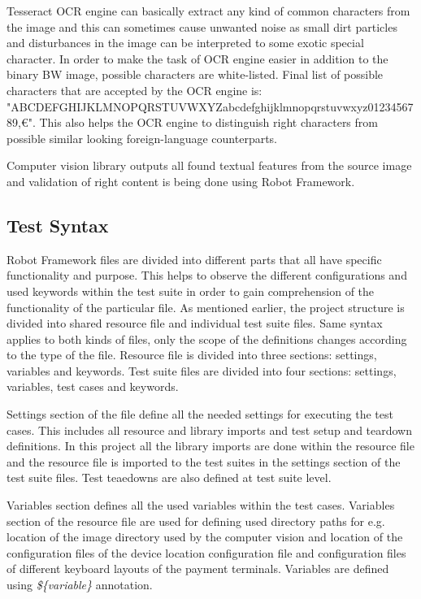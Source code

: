 Tesseract OCR engine can basically extract any kind of common characters from the image and this can sometimes cause unwanted noise as small dirt particles and disturbances in the image can be interpreted to some exotic special character. In order to make the task of OCR engine easier in addition to the binary BW image, possible characters are white-listed. Final list of possible characters that are accepted by the OCR engine is: "ABCDEFGHIJKLMNOPQRSTUVWXYZabcdefghijklmnopqrstuvwxyz0123456789,\euro". This also helps the OCR engine to distinguish right characters from possible similar looking foreign-language counterparts.

Computer vision library outputs all found textual features from the source image and validation of right content is being done using Robot Framework. 

\subsection{Test Syntax}
\label{subsection:Test syntax}

Robot Framework files are divided into different parts that all have specific functionality and purpose. This helps to observe the different configurations and used keywords within the test suite in order to gain comprehension of the functionality of the particular file. As mentioned earlier, the project structure is divided into shared resource file and individual test suite files. Same syntax applies to both kinds of files, only the scope of the definitions changes according to the type of the file. Resource file is divided into three sections: settings, variables and keywords. Test suite files are divided into four sections: settings, variables, test cases and keywords.

Settings section of the file define all the needed settings for executing the test cases. This includes all resource and library imports and test setup and teardown definitions. In this project all the library imports are done within the resource file and the resource file is imported to the test suites in the settings section of the test suite files. Test teaedowns are also defined at test suite level.

Variables section defines all the used variables within the test cases. Variables section of the resource file are used for defining used directory paths for e.g. location of the image directory used by the computer vision and location of the configuration files of the device location configuration file and configuration files of different keyboard layouts of the payment terminals. Variables are defined using \emph{\$\{variable\}} annotation.

